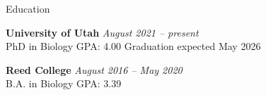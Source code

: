 \documentclass{resume} %
\begin{document}

\begin{rSection}{Education}

{\bf University of Utah} \hfill {\em August 2021 -- present} \\ 
PhD in Biology \textbar \space GPA: 4.00
 \hfill {Graduation expected May 2026} 
 \smallskip 

{\bf Reed College} \hfill {\em August 2016 -- May 2020} \\ 
B.A. in Biology \textbar \space GPA: 3.39


\end{rSection}

\end{document}
